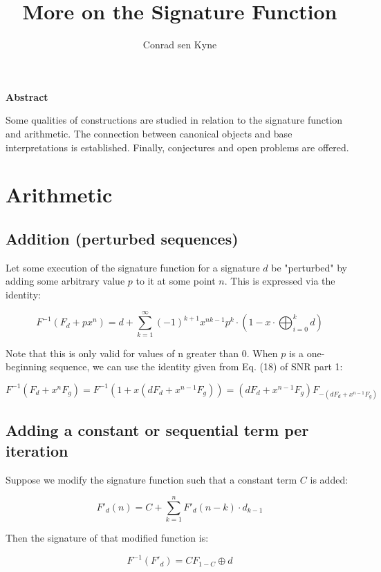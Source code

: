 \documentclass{article}
\title{\Large More on the Signature Function}
\author{Conrad sen Kyne}
\date{}
\begin{document}
\maketitle

\begin{center}
\textbf{Abstract}
\end{center}

\noindent Some qualities of constructions are studied in relation to the signature function and arithmetic. The connection between canonical objects and base interpretations is established. Finally, conjectures and open problems are offered.

\tableofcontents

\pagebreak

\section{Arithmetic}

\subsection{Addition (perturbed sequences)}

Let some execution of the signature function for a signature $d$ be "perturbed" by adding some arbitrary value $p$ to it at some point $n$. This is expressed via the identity:

$$F^{-1} (F_d + px^n) = d + \sum_{k=1}^{\infty} (-1)^{k+1} x^{nk - 1} p^k \cdot \left( 1 - x \cdot \bigoplus_{i=0}^{k} d \right)$$

\noindent Note that this is only valid for values of n greater than 0. When $p$ is a one-beginning sequence, we can use the identity given from Eq. (18) of SNR part 1:

$$F^{-1} (F_d + x^n F_g) = F^{-1} \left(1 + x(dF_d + x^{n-1} F_g) \right) = (dF_d + x^{n-1} F_g) F_{-(dF_d + x^{n-1} F_g)}$$

\subsection{Adding a constant or sequential term per iteration}

Suppose we modify the signature function such that a constant term $C$ is added:

$$F'_d (n) = C + \sum_{k=1}^{n} F'_d (n-k) \cdot d_{k-1}$$

\noindent Then the signature of that modified function is:

$$F^{-1}(F'_d) = CF_{1 - C} \oplus d$$
\end{document}
